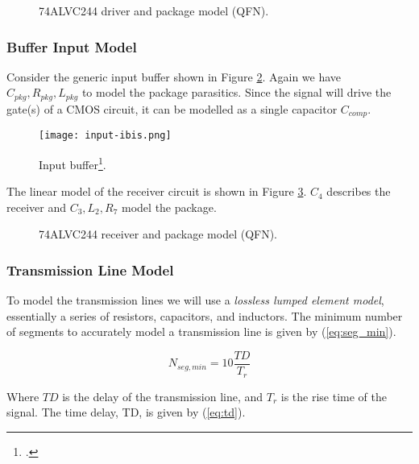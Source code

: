 \documentclass[../main.tex]{subfiles}
\begin{document}
\begin{figure}[h]
    \centering
    \caption{74ALVC244 driver and package model (QFN).}
    \label{fig:driver-package}
\end{figure}

\newpage

\subsubsection{Buffer Input Model}

Consider the generic input buffer shown in Figure \ref{fig:ibis-input}. Again we have $C_{pkg}, R_{pkg}, L_{pkg}$ to model the package parasitics. Since the signal will drive the gate(s) of a CMOS circuit, it can be modelled as a single capacitor $C_{comp}$.

\begin{figure}[h]
    \centering
    \texttt{[image: input-ibis.png]}
    \caption{Input buffer\footcite{ibis}.}
    \label{fig:ibis-input}
\end{figure}

The linear model of the receiver circuit is shown in Figure \ref{fig:receiver-package}. $C_4$ describes the receiver and $C_3, L_2, R_7$ model the package.

\begin{figure}[h]
    \centering
    \caption{74ALVC244 receiver and package model (QFN).}
    \label{fig:receiver-package}
\end{figure}

\subsubsection{Transmission Line Model}

To model the transmission lines we will use a \textit{lossless lumped element model}, essentially a series of resistors, capacitors, and inductors. The minimum number of segments to accurately model a transmission line is given by (\ref{eq:seg_min}).

\begin{equation} \label{eq:seg_min}
    N_{seg, min} = 10 \frac{TD}{T_{r}}
\end{equation}

Where $TD$ is the delay of the transmission line, and $T_{r}$ is the rise time of the signal. The time delay, TD, is given by (\ref{eq:td}).
\end{document}
